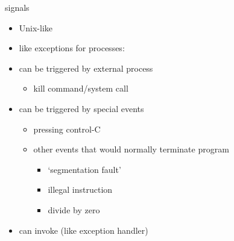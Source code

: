 \usetikzlibrary{shapes.callouts,positioning}

\begin{frame}{signals}
\begin{itemize}
\item Unix-like 
\item like exceptions for processes:
\vspace{.5cm}
\item can be triggered by external process
    \begin{itemize}
    \item kill command/system call
    \end{itemize}
\item can be triggered by special events
    \begin{itemize}
    \item pressing control-C
    \item other events that would normally terminate program
        \begin{itemize}
        \item `segmentation fault'
        \item illegal instruction
        \item divide by zero
        \end{itemize}
    \end{itemize}
\item can invoke  (like exception handler)
\end{itemize}
\end{frame}

